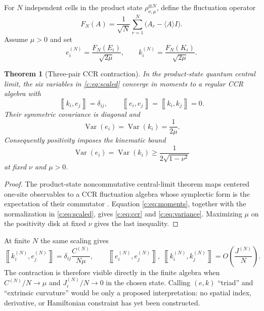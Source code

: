 \documentclass[11pt]{article}
\newtheorem{theorem}{Theorem}[section]
\theoremstyle{remark}\newtheorem{remark}[theorem]{Remark}
\newcommand{\Hbr}[2]{\left\llbracket #1,#2\right\rrbracket}
\begin{document}
For $N$ independent cells in the product state $\rho_{\nu,\mu}^{\otimes N}$, define the fluctuation operator
\begin{equation}
F_N(A)=\frac1{\sqrt N}\sum_{r=1}^N\bigl(A_r-\langle A\rangle I\bigr).
\end{equation}
Assume $\mu>0$ and set
\begin{equation}
e_i^{(N)}=\frac{F_N(E_i)}{\sqrt{2\mu}},\qquad
k_i^{(N)}=\frac{F_N(K_i)}{\sqrt{2\mu}}.
\label{c:eq:scaled}
\end{equation}

\begin{theorem}[Three-pair CCR contraction]\label{c:thm:qclt}
In the product-state quantum central limit, the six variables in \eqref{c:eq:scaled} converge in moments to a regular CCR algebra with
\begin{equation}
\Hbr{k_i}{e_j}=\delta_{ij},\qquad
\Hbr{e_i}{e_j}=\Hbr{k_i}{k_j}=0.
\label{c:eq:ccr}
\end{equation}
Their symmetric covariance is diagonal and
\begin{equation}
\operatorname{Var}(e_i)=\operatorname{Var}(k_i)=\frac1{2\mu}.
\label{c:eq:variance}
\end{equation}
Consequently positivity imposes the kinematic bound
\begin{equation}
\operatorname{Var}(e_i)=\operatorname{Var}(k_i)
\geq\frac1{2\sqrt{1-\nu^2}}
\end{equation}
at fixed $\nu$ and $\mu>0$.
\end{theorem}

\begin{proof}
The product-state noncommutative central-limit theorem maps centered one-site observables to a CCR fluctuation algebra whose symplectic form is the expectation of their commutator \cite{Goderis1989}.  Equation \eqref{c:eq:moments}, together with the normalization in \eqref{c:eq:scaled}, gives \eqref{c:eq:ccr} and \eqref{c:eq:variance}.  Maximizing $\mu$ on the positivity disk at fixed $\nu$ gives the last inequality.
\end{proof}

At finite $N$ the same scaling gives
\begin{equation}
\Hbr{k_i^{(N)}}{e_j^{(N)}}
=\delta_{ij}\frac{C^{(N)}}{N\mu},\qquad
\Hbr{e_i^{(N)}}{e_j^{(N)}},\ \Hbr{k_i^{(N)}}{k_j^{(N)}}
=O\!\left(\frac{J^{(N)}}N\right).
\end{equation}
The contraction is therefore visible directly in the finite algebra when $C^{(N)}/N\to\mu$ and $J_i^{(N)}/N\to0$ in the chosen state.  Calling $(e,k)$ ``triad'' and ``extrinsic curvature'' would be only a proposed interpretation: no spatial index, derivative, or Hamiltonian constraint has yet been constructed.
\end{document}
